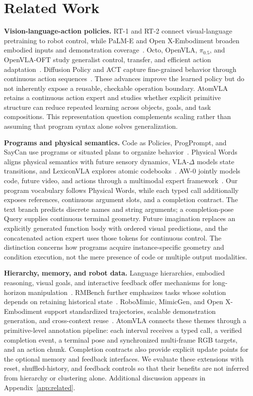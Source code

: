 \section{Related Work}
\label{sec:related}
\textbf{Vision-language-action policies.} RT-1 and RT-2 connect visual-language pretraining to robot control, while PaLM-E and Open X-Embodiment broaden embodied inputs and demonstration coverage~\cite{rt1,rt2,palme,oxembodiment}. Octo, OpenVLA, $\pi_{0.5}$, and OpenVLA-OFT study generalist control, transfer, and efficient action adaptation~\cite{octo,openvla,pi05,oft}. Diffusion Policy and ACT capture fine-grained behavior through continuous action sequences~\cite{diffpolicy,act}. These advances improve the learned policy but do not inherently expose a reusable, checkable operation boundary. AtomVLA retains a continuous action expert and studies whether explicit primitive structure can reduce repeated learning across objects, goals, and task compositions. This representation question complements scaling rather than assuming that program syntax alone solves generalization.

\textbf{Programs and physical semantics.} Code as Policies, ProgPrompt, and SayCan use programs or situated plans to organize behavior~\cite{codeaspolicies,progprompt,saycan}. Physical Words aligns physical semantics with future sensory dynamics, VLA-$\Delta$ models state transitions, and LexiconVLA explores atomic codebooks~\cite{physicalwords,vladelta,lexiconvla}. AW-0 jointly models code, future video, and actions through a multimodal expert framework~\cite{aw0}. Our program vocabulary follows Physical Words, while each typed call additionally exposes references, continuous argument slots, and a completion contract. The text branch predicts discrete names and string arguments; a completion-pose Query supplies continuous terminal geometry. Future imagination replaces an explicitly generated function body with ordered visual predictions, and the concatenated action expert uses those tokens for continuous control. The distinction concerns how programs acquire instance-specific geometry and condition execution, not the mere presence of code or multiple output modalities.

\textbf{Hierarchy, memory, and robot data.} Language hierarchies, embodied reasoning, visual goals, and interactive feedback offer mechanisms for long-horizon manipulation~\cite{rth,ecot,cotvla,inner}. RMBench further emphasizes tasks whose solution depends on retaining historical state~\cite{chen2026rmbench}. RoboMimic, MimicGen, and Open X-Embodiment support standardized trajectories, scalable demonstration generation, and cross-context reuse~\cite{robomimic,mimicgen,oxembodiment}. AtomVLA connects these themes through a primitive-level annotation pipeline: each interval receives a typed call, a verified completion event, a terminal pose and synchronized multi-frame RGB targets, and an action chunk. Completion contracts also provide explicit update points for the optional memory and feedback interfaces. We evaluate these extensions with reset, shuffled-history, and feedback controls so that their benefits are not inferred from hierarchy or clustering alone. Additional discussion appears in Appendix~\ref{app:related}.
